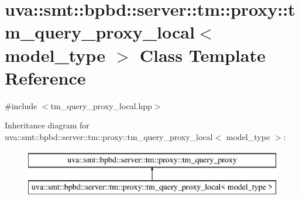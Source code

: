 \hypertarget{classuva_1_1smt_1_1bpbd_1_1server_1_1tm_1_1proxy_1_1tm__query__proxy__local}{}\section{uva\+:\+:smt\+:\+:bpbd\+:\+:server\+:\+:tm\+:\+:proxy\+:\+:tm\+\_\+query\+\_\+proxy\+\_\+local$<$ model\+\_\+type $>$ Class Template Reference}
\label{classuva_1_1smt_1_1bpbd_1_1server_1_1tm_1_1proxy_1_1tm__query__proxy__local}


{\ttfamily \#include $<$tm\+\_\+query\+\_\+proxy\+\_\+local.\+hpp$>$}

Inheritance diagram for uva\+:\+:smt\+:\+:bpbd\+:\+:server\+:\+:tm\+:\+:proxy\+:\+:tm\+\_\+query\+\_\+proxy\+\_\+local$<$ model\+\_\+type $>$\+:\begin{figure}[H]
\begin{center}
\leavevmode
\includegraphics[height=2.000000cm]{classuva_1_1smt_1_1bpbd_1_1server_1_1tm_1_1proxy_1_1tm__query__proxy__local}
\end{center}
\end{figure}
